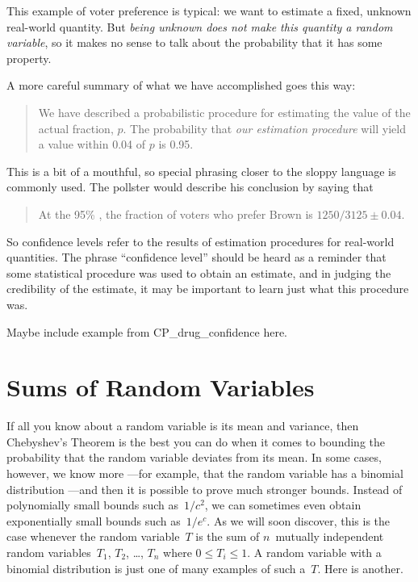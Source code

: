 This example of voter preference is typical: we want to estimate a fixed,
unknown real-world quantity.  But \emph{being unknown does not make this
  quantity a random variable}, so it makes no sense to talk about the
probability that it has some property.

A more careful summary of what we have accomplished goes this way:
\begin{quote}
We have described a probabilistic procedure for estimating the value of
the actual fraction, $p$.  The probability that \emph{our estimation
procedure} will yield a value within 0.04 of $p$ is 0.95.
\end{quote}
This is a bit of a mouthful, so special phrasing closer to the sloppy
language is commonly used.  The pollster would describe his conclusion by
saying that
\begin{quote}
At the 95\% , the fraction of voters
who prefer Brown is $1250/3125 \pm 0.04$.
\end{quote}

So confidence levels refer to the results of estimation procedures for
real-world quantities.  The phrase ``confidence level'' should be heard as
a reminder that some statistical procedure was used to obtain an estimate,
and in judging the credibility of the estimate, it may be important to
learn just what this procedure was.

\begin{editingnotes}
Maybe include example from CP\_drug\_confidence here.
\end{editingnotes}

\begin{problems}

\classproblems
{}

\examproblems
{}

\end{problems}

\section{Sums of Random Variables}

If all you know about a random variable is its mean and variance, then
Chebyshev's Theorem is the best you can do when it comes to bounding
the probability that the random variable deviates from its mean.  In
some cases, however, we know more ---for example, that the random
variable has a binomial distribution ---and then it is possible to
prove much stronger bounds.  Instead of polynomially small bounds such
as~$1/c^2$, we can sometimes even obtain exponentially small bounds
such as~$1/e^c$.  As we will soon discover, this is the case whenever
the random variable~$T$ is the sum of $n$~mutually independent random
variables~$T_1$, $T_2$, \dots, $T_n$ where $0 \le T_i \le 1$.  A
random variable with a binomial distribution is just one of many
examples of such a~$T$.  Here is another.

